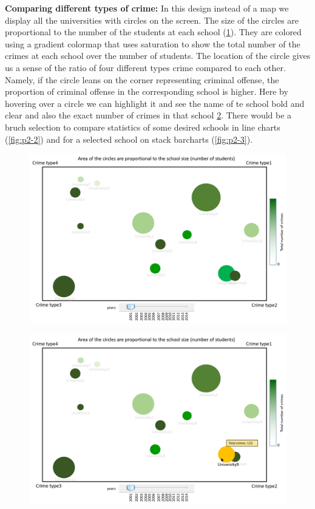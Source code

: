 \documentclass[12pt]{article}
\begin{document}
\noindent
\textbf{Comparing different types of crime:} In this design instead of a map we display all the universities with circles on the screen. The size of the circles are proportional to the number of the students at each school (\cref{fig:p2-overall}). They are colored using a gradient colormap that uses saturation to show the total number of the crimes at each school over the number of students. The location of the circle gives us a sense of the ratio of four different types crime compared to each other. Namely, if the circle leans on the corner representing criminal offense, the proportion of criminal offense in the corresponding school is higher. Here by hovering over a circle we can highlight it and see the name of te school bold and clear and also the exact number of crimes in that school \cref{fig:p2-1}. There would be a bruch selection to compare statistics of some desired schools in line charts (\cref{fig:p2-2}) and for a selected school on stack barcharts (\cref{fig:p2-3}).
\\

\begin{figure}[tbph]
   \centering{}
	       \includegraphics[width=6in]{prot2-overall}           
\caption{}
\label{fig:p2-overall}
\end{figure}

\begin{figure}[tbph]
   \centering{}
	       \includegraphics[width=6in]{prot2-1}           
\caption{}
\label{fig:p2-1}
\end{figure}
\end{document}
